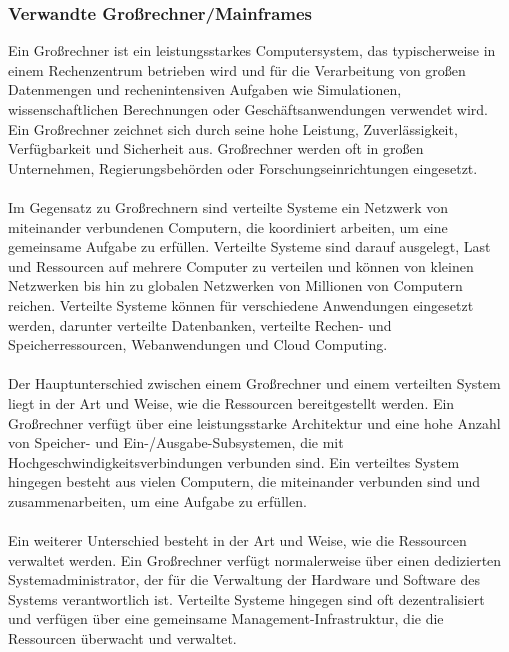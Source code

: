 \subsubsection{Verwandte Großrechner/Mainframes}
Ein Großrechner ist ein leistungsstarkes Computersystem, das typischerweise in einem Rechenzentrum betrieben wird und für die Verarbeitung von großen Datenmengen und rechenintensiven Aufgaben wie Simulationen, wissenschaftlichen Berechnungen oder Geschäftsanwendungen verwendet wird. Ein Großrechner zeichnet sich durch seine hohe Leistung, Zuverlässigkeit, Verfügbarkeit und Sicherheit aus. Großrechner werden oft in großen Unternehmen, Regierungsbehörden oder Forschungseinrichtungen eingesetzt.
\\\\
Im Gegensatz zu Großrechnern sind verteilte Systeme ein Netzwerk von miteinander verbundenen Computern, die koordiniert arbeiten, um eine gemeinsame Aufgabe zu erfüllen. Verteilte Systeme sind darauf ausgelegt, Last und Ressourcen auf mehrere Computer zu verteilen und können von kleinen Netzwerken bis hin zu globalen Netzwerken von Millionen von Computern reichen. Verteilte Systeme können für verschiedene Anwendungen eingesetzt werden, darunter verteilte Datenbanken, verteilte Rechen- und Speicherressourcen, Webanwendungen und Cloud Computing.
\\\\
Der Hauptunterschied zwischen einem Großrechner und einem verteilten System liegt in der Art und Weise, wie die Ressourcen bereitgestellt werden. Ein Großrechner verfügt über eine leistungsstarke Architektur und eine hohe Anzahl von Speicher- und Ein-/Ausgabe-Subsystemen, die mit Hochgeschwindigkeitsverbindungen verbunden sind. Ein verteiltes System hingegen besteht aus vielen Computern, die miteinander verbunden sind und zusammenarbeiten, um eine Aufgabe zu erfüllen.
\\\\
Ein weiterer Unterschied besteht in der Art und Weise, wie die Ressourcen verwaltet werden. Ein Großrechner verfügt normalerweise über einen dedizierten Systemadministrator, der für die Verwaltung der Hardware und Software des Systems verantwortlich ist. Verteilte Systeme hingegen sind oft dezentralisiert und verfügen über eine gemeinsame Management-Infrastruktur, die die Ressourcen überwacht und verwaltet.

